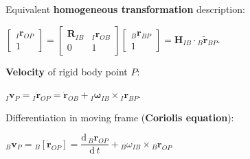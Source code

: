 \documentclass[landscape]{article}
\newcommand{\vmspace}{\vspace{-7pt}}
\newcommand{\vpspace}{\vspace{5pt}}
\begin{document}
\begin{multicols}{3}
\vpspace

\begin{minipage}{\columnwidth}
  Equivalent \textbf{homogeneous transformation} description:
  \vmspace
  \begin{center}
    $\left[\begin{matrix}
      {}_I\mathbf{r}_{OP} \\
      1
    \end{matrix}\right]
    =
    \left[\begin{matrix}
      \mathbf{R}_{IB} & {}_I\mathbf{r}_{OB} \\
      0 & 1
    \end{matrix}\right]
    \left[\begin{matrix}
      {}_B\mathbf{r}_{BP} \\
      1
    \end{matrix}\right]
    =
    \mathbf{H}_{IB}\cdot{}_B\tilde{\mathbf r}_{BP}.
    $
  \end{center}
\end{minipage}

\vpspace

\begin{minipage}{\columnwidth}
  \textbf{Velocity} of rigid body point $P$:
  \vmspace
  \begin{center}
    ${}_I \mathbf v_P = {}_I \mathbf{\dot r}_{OP} = \mathbf{\dot r}_{OB} +
    {}_I\mathbf{\omega}_{IB} \times {}_I\mathbf r_{BP}.$
  \end{center}
\end{minipage}

\vpspace

\begin{minipage}{\columnwidth}
  Differentiation in moving frame (\textbf{Coriolis equation}):
  \vmspace
  \begin{center}
    ${}_B\mathbf v_P = {}_B\left[\mathbf{\dot r}_{OP}\right] = \dfrac{\mathrm
    d\, {}_B\mathbf r_{OP}}{\mathrm d \,t} + {}_B\omega_{IB} \times {}_B\mathbf
    r_{OP}$
  \end{center}
\end{minipage}

\vpspace


\end{multicols}
\end{document}
